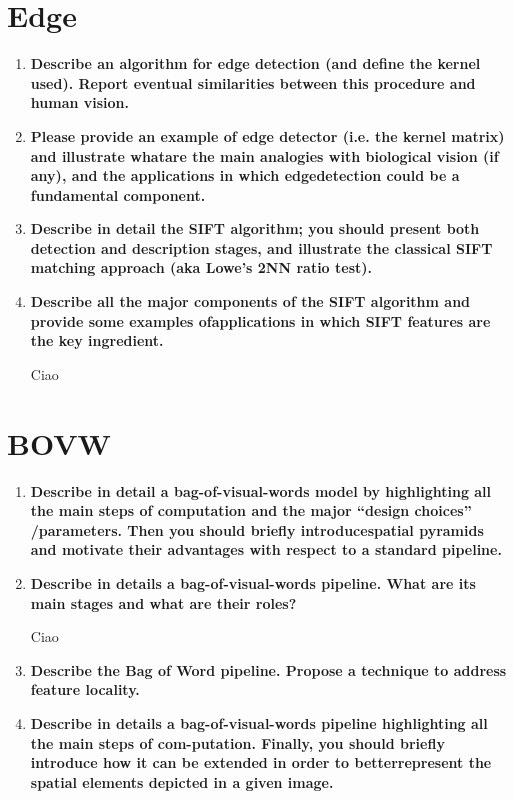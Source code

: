 \documentclass[12pt]{article}
\begin{document}
\section{Edge}

\begin{enumerate}
    \item \textbf{Describe an algorithm for edge detection (and define the kernel used). Report eventual similarities between this procedure and human vision.}

    \item \textbf{Please provide an example of edge detector (i.e. the kernel matrix) and illustrate whatare the main analogies with biological vision (if any),
              and the applications in which edgedetection could be a fundamental component.}

    \item \textbf{Describe in detail the SIFT algorithm; you should present both detection and description stages,
              and illustrate the classical SIFT matching approach (aka Lowe’s 2NN ratio test).}

    \item \textbf{Describe all the major components of the SIFT algorithm and provide some examples ofapplications in which SIFT features are the key ingredient.}

          Ciao

\end{enumerate}

\section{BOVW}
\begin{enumerate}
    \item \textbf{Describe in detail a bag-of-visual-words model by highlighting all the main steps of computation and the major “design choices” /parameters.
              Then you should briefly introducespatial pyramids and motivate their advantages with respect to a standard pipeline.}

    \item \textbf{Describe in details a bag-of-visual-words pipeline. What are its main stages and what are their roles?}

          Ciao
    \item \textbf{Describe the Bag of Word pipeline. Propose a technique to address feature locality.}

    \item \textbf{Describe in details a bag-of-visual-words pipeline highlighting all the main steps of com-putation.
              Finally, you should briefly introduce how it can be extended in order to betterrepresent the spatial elements depicted in a given image.}

\end{enumerate}
\end{document}
